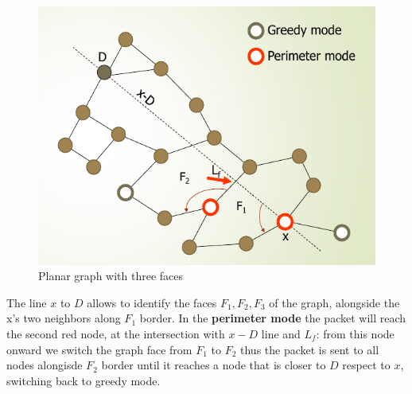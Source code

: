 \documentclass[10pt,a4paper]{report}
\theoremstyle{definition}
\begin{document}
\begin{figure}[h]
	\centering
	\includegraphics[scale=0.50]{images/Pasted image 20230523155042.png}	
	\caption{Planar graph with three faces}
	
\end{figure}

The line $x$ to $D$ allows to identify the faces $F_{1}, F_{2}, F_{3}$ of the graph, alongside the x's two neighbors along $F_{1}$ border.
In the \textbf{perimeter mode} the packet will reach the second red node, at the intersection with $x-D$ line and $L_{f}$: from this node onward we switch the graph face from $F_{1}$ to $F_{2}$ thus the packet is sent to all nodes alongisde $F_{2}$ border until it reaches a node that is closer to $D$ respect to $x$, switching back to greedy mode.\\
\end{document}
